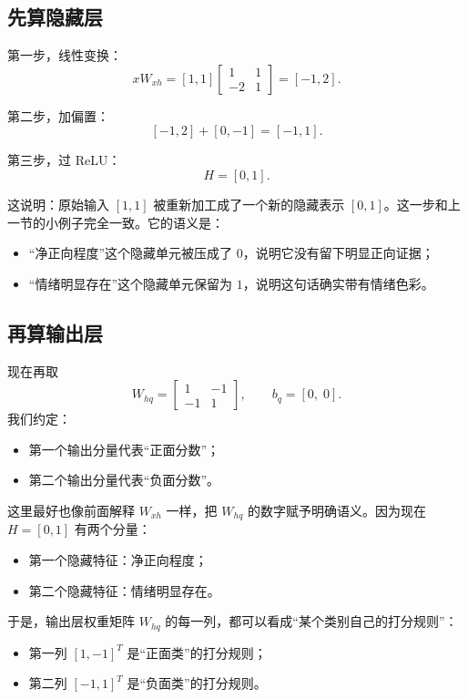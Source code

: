 \documentclass[12pt,a4paper]{ctexart}
\begin{document}
\subsection{先算隐藏层}

第一步，线性变换：
\[
xW_{xh}
=
[1,1]
\begin{bmatrix}
1 & 1\\
-2 & 1
\end{bmatrix}
=
[-1,2].
\]

第二步，加偏置：
\[
[-1,2] + [0,-1] = [-1,1].
\]

第三步，过 ReLU：
\[
H = [0,1].
\]

这说明：原始输入 \([1,1]\) 被重新加工成了一个新的隐藏表示 \([0,1]\)。这一步和上一节的小例子完全一致。它的语义是：
\begin{itemize}
  \item “净正向程度”这个隐藏单元被压成了 \(0\)，说明它没有留下明显正向证据；
  \item “情绪明显存在”这个隐藏单元保留为 \(1\)，说明这句话确实带有情绪色彩。
\end{itemize}

\subsection{再算输出层}

现在再取
\[
W_{hq} =
\begin{bmatrix}
1 & -1\\
-1 & 1
\end{bmatrix},
\qquad
b_q = [0,\;0].
\]
我们约定：
\begin{itemize}
  \item 第一个输出分量代表“正面分数”；
  \item 第二个输出分量代表“负面分数”。
\end{itemize}

这里最好也像前面解释 \(W_{xh}\) 一样，把 \(W_{hq}\) 的数字赋予明确语义。因为现在 \(H=[0,1]\) 有两个分量：
\begin{itemize}
  \item 第一个隐藏特征：净正向程度；
  \item 第二个隐藏特征：情绪明显存在。
\end{itemize}

于是，输出层权重矩阵 \(W_{hq}\) 的每一列，都可以看成“某个类别自己的打分规则”：
\begin{itemize}
  \item 第一列 \([1,-1]^T\) 是“正面类”的打分规则；
  \item 第二列 \([-1,1]^T\) 是“负面类”的打分规则。
\end{itemize}
\end{document}
